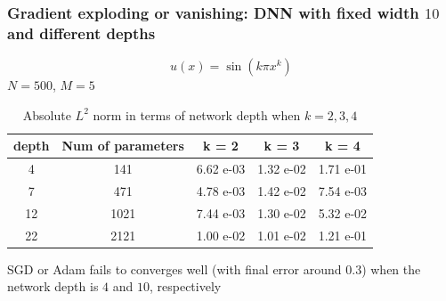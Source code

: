 \documentclass{beamer}
\begin{document}
\begin{frame}
\frametitle{Gradient exploding or vanishing: DNN with fixed width $10$ and different depths}

\begin{equation*}
	u(x) = \sin(k\pi x ^k)
\end{equation*} 
$N = 500$, $M = 5$
\begin{table}
	\centering
	\begin{tabular}{|c|c|c|c|c|}
	\hline
		 depth & Num of parameters & k = 2 &  k = 3 & k = 4  \\
		\hline
		4   & 141 & 6.62 e-03 & 1.32 e-02 & 1.71 e-01\\
		7   & 471 & 4.78 e-03 & 1.42 e-02 & 7.54 e-03\\
		12  & 1021 & 7.44 e-03 & 1.30 e-02 & 5.32 e-02\\
		22  & 2121 & 1.00 e-02 & 1.01 e-02 & 1.21 e-01\\
		\hline
	\end{tabular}
	\caption{Absolute $L^2$ norm in terms of network depth when $k=2, 3, 4$}
\end{table}	

SGD or Adam fails to converges well (with final error around $0.3$) when the network depth is $4$ and $10$, respectively

\end{frame}
\end{document}
